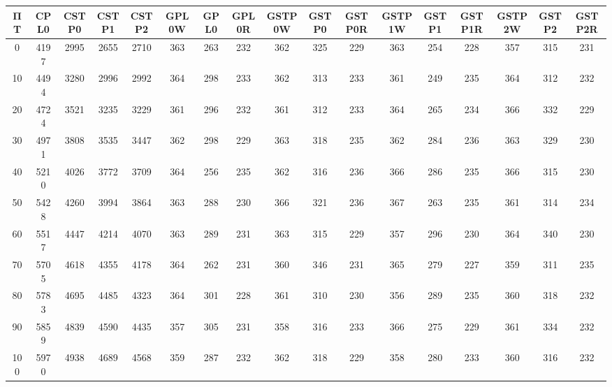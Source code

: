 \begin{tabular}{|c|c|c|c|c|c|c|c|c|c|c|c|c|c|c|c|c|}
\hline
ΠΤ&CPL0&CSTP0&CSTP1&CSTP2&GPL0W&GPL0&GPL0R&GSTP0W&GSTP0&GSTP0R&GSTP1W&GSTP1&GSTP1R&GSTP2W&GSTP2&GSTP2R\\\hline
\hline
0&4197&2995&2655&2710&363&263&232&362&325&229&363&254&228&357&315&231\\
\hline
10&4494&3280&2996&2992&364&298&233&362&313&233&361&249&235&364&312&232\\
\hline
20&4724&3521&3235&3229&361&296&232&361&312&233&364&265&234&366&332&229\\
\hline
30&4971&3808&3535&3447&362&298&229&363&318&235&362&284&236&363&329&230\\
\hline
40&5210&4026&3772&3709&364&256&235&362&316&236&366&286&235&366&315&230\\
\hline
50&5428&4260&3994&3864&363&288&230&366&321&236&367&263&235&361&314&234\\
\hline
60&5517&4447&4214&4070&363&289&231&363&315&229&357&296&230&364&340&230\\
\hline
70&5705&4618&4355&4178&364&262&231&360&346&231&365&279&227&359&311&235\\
\hline
80&5783&4695&4485&4323&364&301&228&361&310&230&356&289&235&360&318&232\\
\hline
90&5859&4839&4590&4435&357&305&231&358&316&233&366&275&229&361&334&232\\
\hline
100&5970&4938&4689&4568&359&287&232&362&318&229&358&280&233&360&316&232\\
\hline
\end{tabular}
